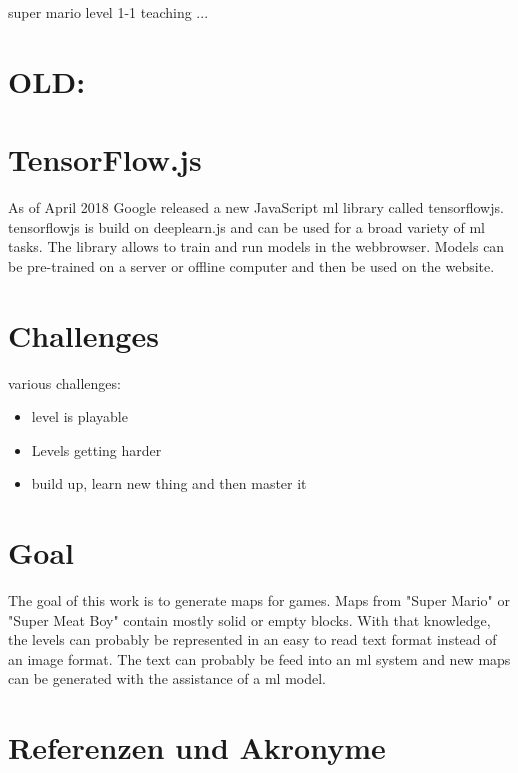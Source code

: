 \documentclass[10pt,a4paper]{article}
\begin{document}
super mario level 1-1 teaching ...
\section{OLD:}
\section{TensorFlow.js}
As of April 2018 Google released a new JavaScript \gls{ml} library called \gls{tensorflowjs}. \gls{tensorflowjs} is build on deeplearn.js and can be used for a broad variety of \gls{ml} tasks. The library allows to train and run models in the webbrowser. Models can be pre-trained on a server or offline computer and then be used on the website.

\section{Challenges}
various challenges:
\begin{itemize}
\item level is playable
\item Levels getting harder
\item build up, learn new thing and then master it
\end{itemize}


\section{Goal}
The goal of this work is to generate maps for games. Maps from "Super Mario" or "Super Meat Boy" contain mostly solid or empty blocks. With that knowledge, the levels can probably be represented in an easy to read text format instead of an image format. The text can probably be feed into an \gls{ml} system and new maps can be generated with the assistance of a \gls{ml} model.

\section{Referenzen und Akronyme}

\printglossaries


%
%

%


\listoffigures
\listoftables

\end{document}
